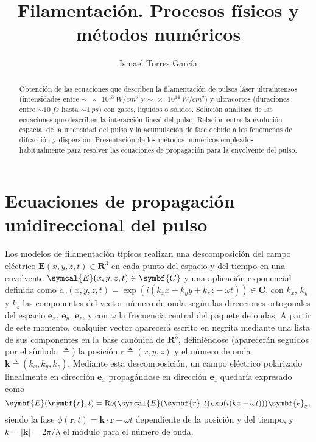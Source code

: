 \documentclass{scrartcl} %
\title{Filamentación. Procesos físicos y métodos numéricos}
\author{Ismael Torres García}
\newcommand*{\RE}{\operatorname{Re}}
\newcommand*{\abs}[1]{\left|#1\right|}
\begin{document}
\maketitle

\begin{abstract}
Obtención de las ecuaciones que describen la filamentación de pulsos láser ultraintensos (intensidades entre $\sim \qty{e13}{W/cm^2}$ y $\sim \qty{e14}{W/cm^2}$) y ultracortos (duraciones entre $\sim \qty{10}{fs}$ hasta $\sim \qty{1}{ps}$) con gases, líquidos o sólidos. Solución analítica de las ecuaciones que describen la interacción lineal del pulso. Relación entre la evolución espacial de la intensidad del pulso y la acumulación de fase debido a los fenómenos de difracción y dispersión. Presentación de los métodos numéricos empleados habitualmente para resolver las ecuaciones de propagación para la envolvente del pulso.
\end{abstract}

\tableofcontents

\section{Ecuaciones de propagación unidireccional del pulso}\label{sec:1}
Los modelos de filamentación típicos realizan una descomposición del campo eléctrico $\symbf{E}(x,y,z,t) \in \symbf{R}^{3}$ en cada punto del espacio y del tiempo en una envolvente $\symcal{E}(x,y,z,t) \in \symbf{C}$ y una aplicación exponencial definida como $c_{\omega}(x,y,z,t) = \exp({i(k_{x}x + k_{y}y + k_{z}z - \omega t)}) \in \symbf{C}$, con $k_{x}$, $k_{y}$ y $k_{z}$ las componentes del vector número de onda según las direcciones ortogonales del espacio $\symbf{e}_{x}$, $\symbf{e}_{y}$, $\symbf{e}_{z}$, y con $\omega$ la frecuencia central del paquete de ondas. A partir de este momento, cualquier vector aparecerá escrito en negrita mediante una lista de sus componentes en la base canónica de $\symbf{R}^{3}$, definiéndose (aparecerán seguidos por el símbolo $\triangleq$) la posición $\symbf{r} \triangleq (x,y,z)$ y el número de onda $\symbf{k} \triangleq (k_{x},k_{y},k_{z})$. Mediante esta descomposición, un campo eléctrico polarizado linealmente en dirección $\symbf{e}_{x}$ propagándose en dirección $\symbf{e}_{z}$ quedaría expresado como 
\begin{equation}\label{eq:1}
  \symbf{E}(\symbf{r},t) = \RE (\symcal{E}(\symbf{r},t)\exp(i(kz - \omega t)))\symbf{e}_{x},
\end{equation}
siendo la fase $\phi(\symbf{r},t) = \symbf{k}\cdot \symbf{r} - \omega t$ dependiente de la posición y del tiempo, y $k = \abs{\symbf{k}} = 2 \pi / \lambda$ el módulo para el número de onda. 
\end{document}
